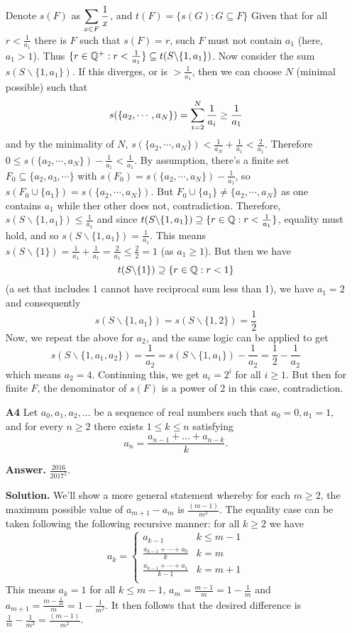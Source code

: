 \documentclass[11pt,a4paper]{article}
\begin{document}
\begin{enumerate}
	Denote $s(F)$ as $\displaystyle\sum_{x\in F}\frac 1x$, and $t(F)=\{s(G): G\subseteq F\}$
	Given that for all $r<\frac{1}{a_1}$ there is $F$ such that $s(F)=r$, such $F$ must not contain $a_1$ (here, $a_1>1$). 
	Thus $\{r\in{\mathbb Q}^+: r<\frac{1}{a_1}\}\subseteq t(S\backslash\{1, a_1\})$. 
	Now consider the sum $s(S\backslash\{1, a_1\})$. If this diverges, or is $>\frac{1}{a_1}$, then we can choose $N$ (minimal possible) such that 
	\[
	s(\{a_2, \cdots , a_N\})=\displaystyle\sum_{i=2}^N \frac{1}{a_i}\ge \frac{1}{a_1}
	\]
	and by the minimality of $N$, $s(\{a_2, \cdots , a_N\})<\frac{1}{a_N}+\frac{1}{a_1}<\frac{2}{a_1}$. 
	Therefore $0\le s(\{a_2, \cdots , a_N\}) - \frac{1}{a_1}<\frac 1{a_1}$. 
	By assumption, there's a finite set $F_0\subseteq \{a_2, a_3, \cdots\}$ with $s(F_0)=s(\{a_2, \cdots , a_N\})-\frac{1}{a_1}$, so $s(F_0\cup \{a_1\})=s(\{a_2, \cdots , a_N\})$. 
	But $F_0\cup \{a_1\}\neq \{a_2, \cdots , a_N\}$ as one contains $a_1$ while ther other does not, contradiction. 
	Therefore, $s(S\backslash\{1, a_1\})\le \frac{1}{a_1}$ and since $t(S\backslash\{1, a_1\})\supseteq\{r\in{\mathbb Q}: r<\frac{1}{a_1}\}$, equality must hold, and so $s(S\backslash\{1, a_1\})= \frac{1}{a_1}$. 
	This means $s(S\backslash\{1\})= \frac{1}{a_1}+\frac{1}{a_1}=\frac{2}{a_1}\le \frac{2}{2}=1$ (as $a_1\ge 1$). 
	But then we have 
	\[
	t(S\backslash\{1\})\supseteq \{r\in{\mathbb Q}: r<1\}
	\]
	(a set that includes 1 cannot have reciprocal sum less than 1), we have $a_1=2$ and consequently 
	\[
	s(S\backslash\{1, a_1\})=s(S\backslash\{1, 2\})=\frac 12
	\]
	Now, we repeat the above for $a_2$, and the same logic can be applied to get 
	\[
	s(S\backslash\{1, a_1, a_2\})=\frac{1}{a_2}=s(S\backslash\{1, a_1\})-\frac{1}{a_2}=\frac 12-\frac{1}{a_2}
	\]
	which means $a_2=4$. Continuing this, we get $a_i=2^i$ for all $i\ge 1$. 
	But then for finite $F$, the denominator of $s(F)$ is a power of 2 in this case, contradiction. 
	
	\item[\textbf{A4}]
	Let $a_0,a_1,a_2,\dots $ be a sequence of real numbers such that $a_0=0, a_1=1,$ and for every $n\geq 2$ there exists $1 \leq k \leq n$ satisfying\[ a_n=\frac{a_{n-1}+\dots + a_{n-k}}{k}. \]
	
	\textbf{Answer.} $\frac{2016}{2017^2}$. 
	
	\textbf{Solution.} 
	We'll show a more general statement whereby for each $m\ge 2$, the maximum possible value of $a_{m+1}-a_m$ is $\frac{(m-1)}{m^2}$. 
	The equality case can be taken following the following recursive manner: for all $k\ge 2$ we have 
	\begin{equation}
		a_k
		=\begin{cases}
			a_{k-1} & k\le m - 1\\
			\frac{a_{k-1} + \cdots + a_0}{k} & k=m\\
			\frac{a_{k-1} + \cdots + a_1}{k - 1} & k = m + 1\\
		\end{cases}
	\end{equation}
    This means $a_k=1$ for all $k\le m-1$, $a_m = \frac{m-1}{m} = 1 - \frac{1}{m}$ and $a_{m+1} = \frac{m - \frac{1}{m}}{m} = 1 - \frac{1}{m^2}$. 
    It then follows that the desired difference is $\frac{1}{m} - \frac{1}{m^2} = \frac{(m-1)}{m^2}$. 
    

\end{enumerate}
\end{document}
